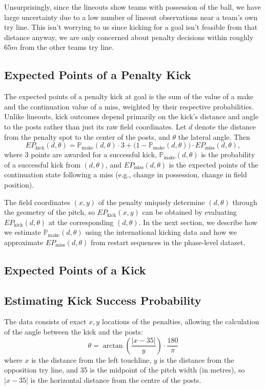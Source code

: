 \documentclass[12pt]{article}
\renewcommand{\P}{\mathbb{P}}
\begin{document}
Unsurprisingly, since the lineouts show teams with possession of the ball, we have large uncertainty due to a low number of lineout observations near a team's own try line. This isn't worrying to us since kicking for a goal isn't feasible from that distance anyway, we are only concerned about penalty decisions within roughly $65m$ from the other teams try line.

\subsection{Expected Points of a Penalty Kick} \label{sec:kick-at-goal}

The expected points of a penalty kick at goal is the sum of the value of a make and the continuation value of a miss, weighted by their respective probabilities. Unlike lineouts, kick outcomes depend primarily on the kick's distance and angle to the posts rather than just its raw field coordinates. Let $d$ denote the distance from the penalty spot to the center of the posts, and $\theta$ the lateral angle. Then
\[
EP_{\text{kick}}(d, \theta) = 
\P_{\text{make}}(d, \theta) \cdot 3 
+ \big(1 - \P_{\text{make}}(d, \theta)\big) \cdot EP_{\text{miss}}(d, \theta),
\]
where 3 points are awarded for a successful kick, $\P_{\text{make}}(d, \theta)$ is the probability of a successful kick from $(d, \theta)$, and $EP_{\text{miss}}(d, \theta)$ is the expected points of the continuation state following a miss (e.g., change in possession, change in field position).

The field coordinates $(x, y)$ of the penalty uniquely determine $(d, \theta)$ through the geometry of the pitch, so $EP_{\text{kick}}(x, y)$ can be obtained by evaluating $EP_{\text{kick}}(d, \theta)$ at the corresponding $(d, \theta)$. In the next section, we describe how we estimate $\P_{\text{make}}(d, \theta)$ using the international kicking data and how we approximate $EP_{\text{miss}}(d, \theta)$ from restart sequences in the phase-level dataset.

\subsection{Expected Points of a Kick}

\subsection{Estimating Kick Success Probability}

The data consists of exact $x, y$ locations of the penalties, allowing the calculation 
of the angle between the kick and the posts:
\[
\theta = \arctan\left(\frac{|x - 35|}{y}\right) \cdot \frac{180}{\pi}
\]
where $x$ is the distance from the left touchline, $y$ is the distance from the 
opposition try line, and 35 is the midpoint of the pitch width (in metres), so 
$|x - 35|$ is the horizontal distance from the centre of the posts. 
\end{document}
